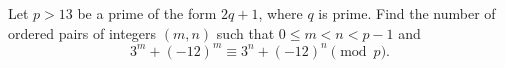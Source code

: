 Let $p>13$ be a prime of the form $2q+1$, where $q$ is prime. Find the number of ordered pairs of integers $(m,n)$ such that $0\le m<n<p-1$ and \[3^m+(-12)^m\equiv 3^n+(-12)^n\pmod{p}.\]